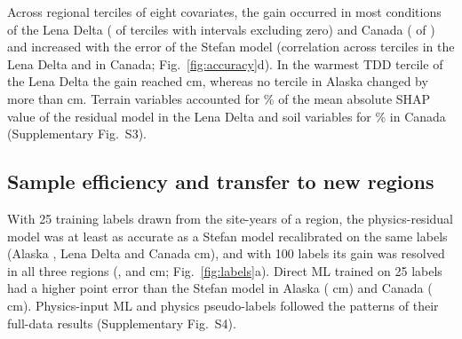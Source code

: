 Across regional terciles of eight covariates, the gain occurred in most conditions of the Lena Delta (\ngcLesig{} of \ngcLecells{} terciles with intervals excluding zero) and Canada (\ngcCasig{} of \ngcCacells) and increased with the error of the Stefan model (correlation across terciles \ngcLecorr{} in the Lena Delta and \ngcCacorr{} in Canada; Fig.~\ref{fig:accuracy}d). In the warmest TDD tercile of the Lena Delta the gain reached \ndtddLewarm{} cm, whereas no tercile in Alaska changed by more than \ngcAkmaxabs{} cm. Terrain variables accounted for \nshapLeResTerrain\% of the mean absolute SHAP value of the residual model in the Lena Delta and soil variables for \nshapCaResSoil\% in Canada (Supplementary Fig.~S3).

\subsection{Sample efficiency and transfer to new regions}
With 25 training labels drawn from the site-years of a region, the physics-residual model was at least as accurate as a Stefan model recalibrated on the same labels (Alaska \nllAkRotwfive, Lena Delta \nllLeRotwfive{} and Canada \nllCaRotwfive{} cm), and with 100 labels its gain was resolved in all three regions (\nllAkRohundred, \nllLeRohundred{} and \nllCaRohundred{} cm; Fig.~\ref{fig:labels}a). Direct ML trained on 25 labels had a higher point error than the Stefan model in Alaska (\nllAkDztwfive{} cm) and Canada (\nllCaDztwfive{} cm). Physics-input ML and physics pseudo-labels followed the patterns of their full-data results (Supplementary Fig.~S4).


